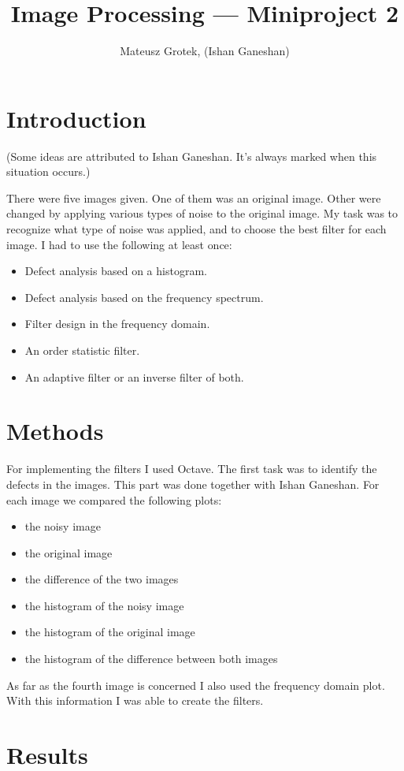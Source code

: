 \documentclass[a4paper]{article}
\title{Image Processing --- Miniproject 2}
\author{Mateusz Grotek, (Ishan Ganeshan)}
\date{}
\begin{document}
\maketitle
{}
\tableofcontents
\section{Introduction}
(Some ideas are attributed to Ishan Ganeshan. It's always marked when this situation occurs.)

There were five images given. One of them was an original image. 
Other were changed by applying various types of noise to the original image.
My task was to recognize what type of noise was applied, and to choose the best filter for each image. I had to use the following at least once:
\begin{itemize}
\item Defect analysis based on a histogram.
\item Defect analysis based on the frequency spectrum.
\item Filter design in the frequency domain.
\item An order statistic filter.
\item An adaptive filter or an inverse filter of both.
\end{itemize}
\section{Methods}
For implementing the filters I used Octave. The first task was to identify the defects in the images. This part was done together with Ishan Ganeshan. For each image we compared the following plots:
\begin{itemize}
\item the noisy image
\item the original image
\item the difference of the two images
\item the histogram of the noisy image
\item the histogram of the original image
\item the histogram of the difference between both images
\end{itemize}
As far as the fourth image is concerned I also used the frequency domain plot. With this information I was able to create the filters.
\section{Results}
\end{document}
